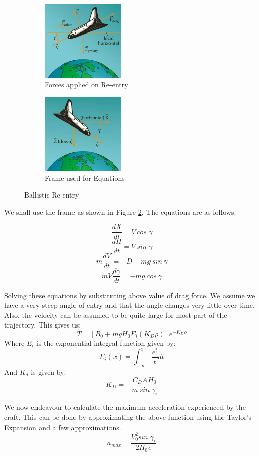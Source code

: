 \documentclass[12pt, letterpaper]{article}
\begin{document}
\begin{figure}[h!]
\centering
\begin{subfigure}{.5\textwidth}
  \centering
  \includegraphics[width=150px]{entryForces}
  \caption{Forces applied on Re-entry}
  \label{fig:forces}
\end{subfigure}%
\begin{subfigure}{.5\textwidth}
  \centering
  \includegraphics[width=150px]{entryFrame}
  \caption{Frame used for Equations}
  \label{fig:frame}
\end{subfigure}
\caption{Ballistic Re-entry}
\label{fig:entry}
\end{figure}

\newpage

We shall use the frame as shown in Figure \ref{fig:frame}. The equations are as follows:

\[
	\frac{dX}{dt} = V\: cos\:\gamma
\]
\[
	\frac{dH}{dt} = V \:sin\:\gamma
\]
\[
	m\frac{dV}{dt} = -D - mg \:sin\:\gamma
\]
\[
	mV\frac{d\gamma}{dt} = -mg\:cos\:\gamma
\]

Solving these equations by substituting above value of drag force. We assume we have a very steep angle of entry and that the angle changes very little over time. Also, the velocity can be assumed to be quite large for most part of the trajectory. This gives us:
\[
	T = \left[ B_0 + mgH_0 E_i(K_D \rho) \right]e ^{-K_D\rho}
\]
Where $E_i$ is the exponential integral function given by:
\[
	E_i(x) = \int_{-\infty}^{x} \frac{e^t}{t} dt
\]
And $K_d$ is given by:
\[
	K_D = -\frac{C_D A H_0}{m\: sin\: \gamma_i}
\]

We now endeavour to calculate the maximum acceleration experienced by the craft. This can be done by approximating the above function using the Taylor's Expansion and a few approximations. 
\[
	a_{max} = \frac{V_0^2 sin\:\gamma_i}{2H_0e}
\]
\end{document}
